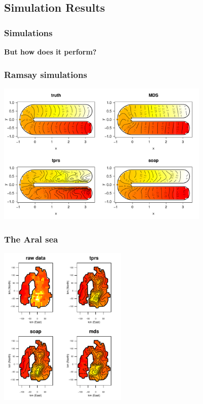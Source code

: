 \documentclass[ignorenonframetext]{beamer} %
\newcommand{\bc}{\begin{center}}
\newcommand{\ec}{\end{center}}
\begin{document}
\subsection{Simulation Results}

\begin{frame}
	\frametitle{Simulations}
	\bc \textbf{But how does it perform?}\ec
\end{frame}


\begin{frame}
	\frametitle{Ramsay simulations}
            \centering
              \includegraphics[width=4in]{figs/ramsay-low.pdf}\\
\end{frame}



\begin{frame}
	\frametitle{The Aral sea}
            \centering
              \includegraphics[height=3in]{figs/aral-fit.pdf}\\
\end{frame}
\end{document}
